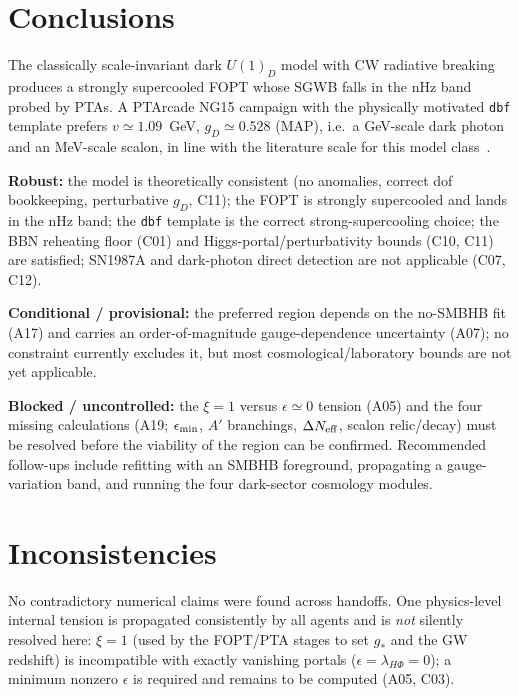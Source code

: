 \documentclass[11pt]{article}
\newcommand{\gD}{g_D}
\begin{document}
\section{Conclusions}
\label{sec:conclusions}
The classically scale-invariant dark $U(1)_D$ model with CW radiative breaking
produces a strongly supercooled FOPT whose SGWB falls in the nHz band probed by
PTAs. A PTArcade NG15 campaign with the physically motivated \texttt{dbf}
template prefers $v\simeq1.09$~GeV, $\gD\simeq0.528$ (MAP), i.e.\ a GeV-scale
dark photon and an MeV-scale scalon, in line with the literature scale for this
model class~\cite{Goncalves2025,Balan2025}.

\textbf{Robust:} the model is theoretically consistent (no anomalies, correct
dof bookkeeping, perturbative $\gD$, C11); the FOPT is strongly supercooled and
lands in the nHz band; the \texttt{dbf} template is the correct strong-supercooling
choice; the BBN reheating floor (C01) and Higgs-portal/perturbativity bounds
(C10, C11) are satisfied; SN1987A and dark-photon direct detection are not
applicable (C07, C12).

\textbf{Conditional / provisional:} the preferred region depends on the no-SMBHB
fit (A17) and carries an order-of-magnitude gauge-dependence uncertainty (A07);
no constraint currently excludes it, but most cosmological/laboratory bounds are
not yet applicable.

\textbf{Blocked / uncontrolled:} the $\xi=1$ versus $\epsilon\simeq0$ tension
(A05) and the four missing calculations (A19; $\epsilon_{\rm min}$,
$A'$ branchings, $\Delta N_{\rm eff}$, scalon relic/decay) must be resolved
before the viability of the region can be confirmed. Recommended follow-ups
include refitting with an SMBHB foreground, propagating a gauge-variation band,
and running the four dark-sector cosmology modules.

\section{Inconsistencies}
\label{sec:inconsistencies}
No contradictory numerical claims were found across handoffs. One physics-level
internal tension is propagated consistently by all agents and is \emph{not}
silently resolved here: $\xi=1$ (used by the FOPT/PTA stages to set $g_*$ and
the GW redshift) is incompatible with exactly vanishing portals
($\epsilon=\lambda_{H\Phi}=0$); a minimum nonzero $\epsilon$ is required and
remains to be computed (A05, C03).
\end{document}
